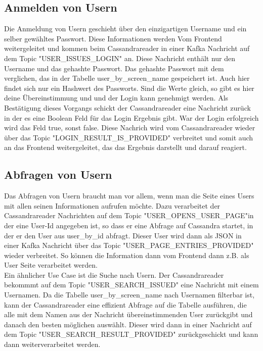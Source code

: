 \subsection{Anmelden von Usern}
Die Anmeldung von Usern geschieht über den einzigartigen Username und ein selber gewähltes Passwort. Diese Informationen werden Vom Frontend weitergeleitet und kommen beim Cassandrareader in einer Kafka Nachricht auf dem Topic "USER\_ISSUES\_LOGIN" an. Diese Nachricht enthält nur den Username und das gehashte Passwort. Das gehashte Passwort mit dem verglichen, das in der Tabelle user\_by\_screen\_name gespeichert ist. Auch hier findet sich nur ein Hashwert des Passworts. Sind die Werte gleich, so gibt es hier deine Übereinstimmung und und der Login kann genehmigt werden. Als Bestätigung dieses Vorgangs schickt der Cassandrareader eine Nachricht zurück in der es eine Boolean Feld für das Login Ergebnis gibt. War der Login erfolgreich wird das Feld true, sonst false. Diese Nachrich wird vom Cassandrareader wieder über das Topic "LOGIN\_RESULT\_IS\_PROVIDED" verbreitet und somit auch an das Frontend weitergeleitet, das das Ergebnis darstellt und darauf reagiert.

\subsection{Abfragen von Usern}
\label{subsec:Userabfrage}
Das Abfragen von Usern braucht man vor allem, wenn man die Seite eines Users mit allen seinen Informationen aufrufen möchte. Dazu verarbeitet der Cassandrareader Nachrichten auf dem Topic "USER\_OPENS\_USER\_PAGE"in der eine User-Id angegeben ist, so dass er eine Abfrage auf Cassandra startet, in der er den User aus user\_by\_id abfragt. Dieser User wird dann als JSON in einer Kafka Nachricht über das Topic "USER\_PAGE\_ENTRIES\_PROVIDED" wieder verbreitet. So können die Information dann vom Frontend dann z.B. als User Seite verarbeitet werden.\\
Ein ähnlicher Use Case ist die Suche nach Usern. Der Cassandrareader bekommmt auf dem Topic "USER\_SEARCH\_ISSUED" eine Nachricht mit einem Usernamen. Da die Tabelle user\_by\_screen\_name nach Usernamen filterbar ist, kann der Cassandrareader eine effizient Abfrage auf die Tabelle ausführen, die alle mit dem Namen aus der Nachricht übereinstimmenden User zurückgibt und danach den besten möglichen auswählt. Dieser wird dann in einer Nachricht auf dem Topic "USER\_SEARCH\_RESULT\_PROVIDED" zurückgeschickt und kann dann weiterverarbeitet werden.

